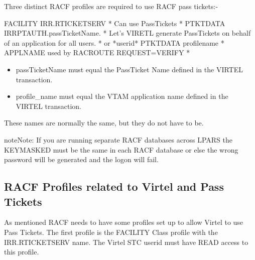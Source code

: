 \documentclass[letterpaper,10pt,english]{sphinxmanual}
\begin{document}
Three distinct RACF profiles are required to use RACF pass tickets:-

\begin{sphinxVerbatim}[commandchars=\\\{\}]
FACILITY IRR.RTICKETSERV           * Can use PassTickets *
PTKTDATA IRRPTAUTH.passTicketName. * Let’s VIRETL generate PassTickets on behalf of an application for all users. * or *userid*
PTKTDATA profile\PYGZus{}name              * APPLNAME used by RACROUTE REQUEST=VERIFY *
\end{sphinxVerbatim}

\begin{itemize}
\item {} 
passTicketName must equal the PassTicket Name defined in the VIRTEL transaction.

\item {} 
profile\_name must equal the VTAM application name defined in the VIRTEL transaction.

\end{itemize}

These names are normally the same, but they do not have to be.

\begin{sphinxadmonition}{note}{Note:}
If you are running separate RACF databases across LPARS the KEYMASKED must be the same in each RACF database or else the wrong password will be generated and the logon will fail.
\end{sphinxadmonition}

\newpage


\subsection{RACF Profiles related to Virtel and Pass Tickets}
\label{\detokenize{connectivity_guide:racf-profiles-related-to-virtel-and-pass-tickets}}
As mentioned RACF needs to have some profiles set up to allow Virtel to use Pass Tickets. The first profile is the FACILITY Class profile with the IRR.RTICKETSERV name. The Virtel STC userid must have READ access to this profile.

 

\begin{sphinxVerbatim}[commandchars=\\\{\}]
  
    
\end{sphinxVerbatim}
\end{document}
